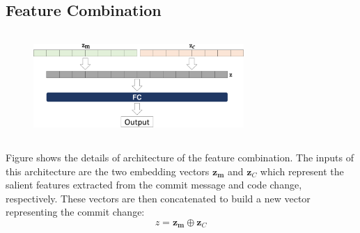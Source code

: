 
\subsection{Feature Combination}
\label{sec:ftr_combine}
\begin{figure}
	\center
	\includegraphics[width=8cm,height=4cm]{figs/code_msg.pdf}
	\caption{}
	\label{fig:code_msg}
\end{figure}

Figure shows the details of architecture of the feature combination. The inputs of this architecture are the two embedding vectors $\textbf{z}_\textbf{m}$ and $\textbf{z}_C$ which represent the salient features extracted from the commit message and code change, respectively. These vectors are then concatenated to build a new vector representing the commit change:
\begin{equation}
\label{eq:commit_code}
z = \textbf{z}_\textbf{m} \oplus \textbf{z}_C
\end{equation}

